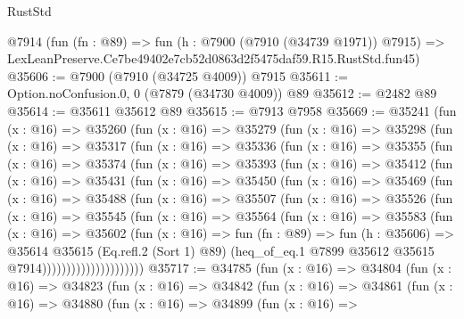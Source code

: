 \begin{lexlean}{RustStd}
\begin{coremodule}
    @7914
    (fun (fn : @89) =>
    fun (h : @7900 (@7910 (@34739 @1971)) @7915) =>
    LexLeanPreserve.Ce7be49402e7cb52d0863d2f5475daf59.R15.RustStd.fun45)
@35606 := @7900 (@7910 (@34725 @4009)) @7915
@35611 := Option.noConfusion.{0, 0} (@7879 (@34730 @4009)) @89
@35612 := @2482 @89
@35614 := @35611 @35612 @89
@35615 := @7913 @7958
@35669 := @35241
    (fun (x : @16) =>
    @35260
      (fun (x : @16) =>
      @35279
        (fun (x : @16) =>
        @35298
          (fun (x : @16) =>
          @35317
            (fun (x : @16) =>
            @35336
              (fun (x : @16) =>
              @35355
                (fun (x : @16) =>
                @35374
                  (fun (x : @16) =>
                  @35393
                    (fun (x : @16) =>
                    @35412
                      (fun (x : @16) =>
                      @35431
                        (fun (x : @16) =>
                        @35450
                          (fun (x : @16) =>
                          @35469
                            (fun (x : @16) =>
                            @35488
                              (fun (x : @16) =>
                              @35507
                                (fun (x : @16) =>
                                @35526
                                  (fun (x : @16) =>
                                  @35545
                                    (fun (x : @16) =>
                                    @35564
                                      (fun (x : @16) =>
                                      @35583
                                        (fun (x : @16) =>
                                        @35602
                                          (fun (x : @16) =>
                                          fun (fn : @89) =>
                                          fun (h : @35606) =>
                                          @35614
                                            @35615
                                            (Eq.refl.{2} (Sort 1) @89)
                                            (heq_of_eq.{1}
                                              @7899
                                              @35612
                                              @35615
                                              @7914)))))))))))))))))))))
@35717 := @34785
    (fun (x : @16) =>
    @34804
      (fun (x : @16) =>
      @34823
        (fun (x : @16) =>
        @34842
          (fun (x : @16) =>
          @34861
            (fun (x : @16) =>
            @34880
              (fun (x : @16) =>
              @34899
                (fun (x : @16) =>

\end{coremodule}
\end{lexlean}
